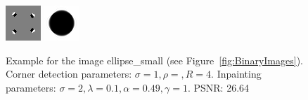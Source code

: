 \begin{figure}[h]
    \centering
    \includegraphics[width=0.2\linewidth]{../Images/ellipse_small-mask.png}
    \includegraphics[width=0.2\linewidth]{../Images/ellipse_small-inpaint.png}
    \caption{Example for the image ellipse\_small (see Figure~\ref{fig:BinaryImages}). Corner
    detection parameters: $\sigma=1,\rho=,R=4$. Inpainting parameters:
$\sigma=2,\lambda=0.1,\alpha=0.49,\gamma=1$. PSNR\@: 26.64}\label{fig:EllipseSmallExample}
\end{figure}

